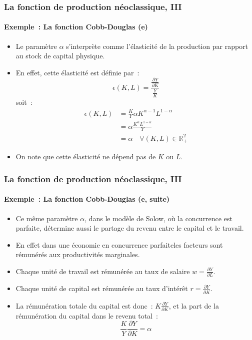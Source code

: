 \documentclass[10pt,notheorems]{beamer}
\theoremstyle{plain}
\theoremstyle{definition} %
\begin{document}
\begin{frame}
  \frametitle{La fonction de production néoclassique, III}
  \framesubtitle{Exemple~: La fonction Cobb-Douglas (e)}

  \medskip

  \begin{itemize}

  \item Le paramètre $\alpha$ s'interprète comme l'élasticité de la production par rapport au stock de capital physique.\newline

  \item En effet, cette élasticité est définie par~:
    \[
      \epsilon(K,L) = \frac{\frac{\partial Y}{\partial K}}{\frac{Y}{K}}
    \]
    soit~:
    \[
      \begin{split}
        \epsilon(K,L) &= \frac{K}{Y}\alpha K^{\alpha-1}L^{1-\alpha}\\
        &= \alpha\frac{K^{\alpha}L^{1-\alpha}}{Y}\\
        &= \alpha \quad \forall (K,L)\in \mathbb R_+^2
      \end{split}
    \]

    \medskip

  \item On note que cette élasticité ne dépend pas de $K$ ou $L$.

  \end{itemize}
\end{frame}


\begin{frame}
  \frametitle{La fonction de production néoclassique, III}
  \framesubtitle{Exemple~: La fonction Cobb-Douglas (e, suite)}

  \medskip

  \begin{itemize}

  \item Ce même paramètre $\alpha$, dans le modèle de Solow, où la concurrence est parfaite, détermine aussi le partage du revenu entre le capital et le travail.\newline

  \item En effet dans une économie en concurrence parfaiteles facteurs sont rémunérés aux productivités marginales.\newline

  \item Chaque unité de travail est rémunérée au taux de salaire $w=\frac{\partial Y}{\partial L}$.\newline

  \item Chaque unité de capital est rémunérée au taux d'intérêt $r = \frac{\partial Y}{\partial K}$.\newline

  \item La rémunération totale du capital est donc~: $K\frac{\partial Y}{\partial K}$, et la part de la rémunération du capital dans le revenu total~:
    \[
      \frac{K}{Y}\frac{\partial Y}{\partial K} = \alpha
    \]

  \end{itemize}
\end{frame}
\end{document}
